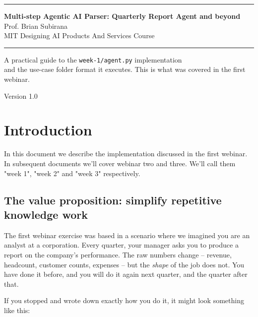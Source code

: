 \documentclass[12pt, a4paper]{article}
\begin{document}
\begin{titlepage}
  \centering
  \vspace*{3cm}
  {\color{primary}\rule{\linewidth}{2pt}}
  \vspace{1cm}

  {\Huge\bfseries\color{darktext} Multi-step Agentic AI Parser: Quarterly Report Agent and beyond}\\[0.5em]
  {\Large\color{mutedtext} Prof. Brian Subirana \\ MIT Designing AI Products And Services Course}

  \vspace{1cm}
  {\color{primary}\rule{\linewidth}{2pt}}

  \vspace{2cm}
  {\large\color{mutedtext}
    A practical guide to the \texttt{week-1/agent.py} implementation\\
    and the use-case folder format it executes. This is what was covered in the first webinar.
  }

  \vfill
  {\small\color{mutedtext} Version 1.0}
\end{titlepage}

\tableofcontents
\newpage

\section{Introduction}

In this document we describe the implementation discussed in the first webinar. In subsequent documents we'll cover webinar two and three. We'll call them "week 1", "week 2" and "week 3" respectively.

\subsection{The value proposition: simplify repetitive knowledge work}

The first webinar exercise was based in a scenario where we imagined you are an analyst at a corporation. Every quarter, your manager asks you to produce a report on the company's performance. The raw numbers change -- revenue, headcount, customer counts, expenses -- but the \textit{shape} of the job does not. You have done it before, and you will do it again next quarter, and the quarter after that.

If you stopped and wrote down exactly how you do it, it might look something like this:
\end{document}
